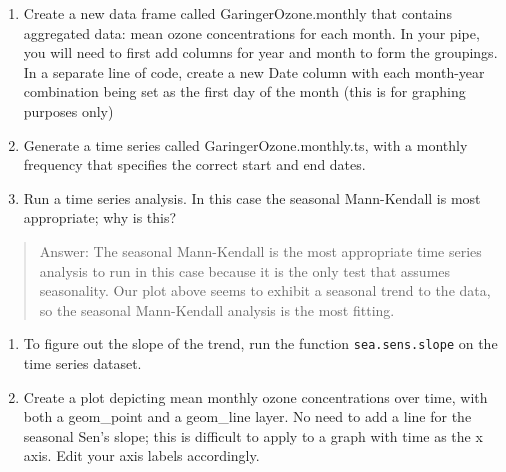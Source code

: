 \documentclass[]{article}
\begin{document}
\begin{enumerate}
\def\labelenumi{\arabic{enumi}.}
\setcounter{enumi}{8}
\item
  Create a new data frame called GaringerOzone.monthly that contains
  aggregated data: mean ozone concentrations for each month. In your
  pipe, you will need to first add columns for year and month to form
  the groupings. In a separate line of code, create a new Date column
  with each month-year combination being set as the first day of the
  month (this is for graphing purposes only)
\item
  Generate a time series called GaringerOzone.monthly.ts, with a monthly
  frequency that specifies the correct start and end dates.
\item
  Run a time series analysis. In this case the seasonal Mann-Kendall is
  most appropriate; why is this?
\end{enumerate}

\begin{quote}
Answer: The seasonal Mann-Kendall is the most appropriate time series
analysis to run in this case because it is the only test that assumes
seasonality. Our plot above seems to exhibit a seasonal trend to the
data, so the seasonal Mann-Kendall analysis is the most fitting.
\end{quote}

\begin{enumerate}
\def\labelenumi{\arabic{enumi}.}
\setcounter{enumi}{11}
\item
  To figure out the slope of the trend, run the function
  \texttt{sea.sens.slope} on the time series dataset.
\item
  Create a plot depicting mean monthly ozone concentrations over time,
  with both a geom\_point and a geom\_line layer. No need to add a line
  for the seasonal Sen's slope; this is difficult to apply to a graph
  with time as the x axis. Edit your axis labels accordingly.
\end{enumerate}
\end{document}
